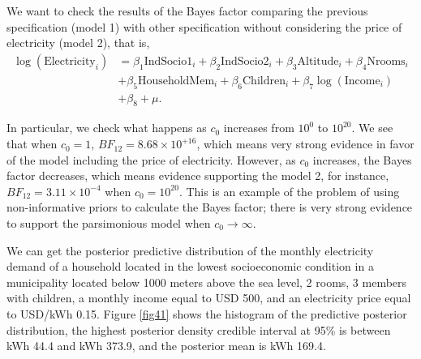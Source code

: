 We want to check the results of the Bayes factor comparing the previous specification (model 1) with other specification without considering the price of electricity (model 2), that is,
\begin{align*}
	\log(\text{Electricity}_i) & = \beta_1\text{IndSocio1}_i + \beta_2\text{IndSocio2}_i + \beta_3\text{Altitude}_i + \beta_4\text{Nrooms}_i\\
	& + \beta_5\text{HouseholdMem}_i + \beta_6\text{Children}_i + \beta_7\log(\text{Income}_i)\\
	& + \beta_8 + \mu.
\end{align*}

In particular, we check what happens as $c_0$ increases from $10^{0}$ to $10^{20}$. We see that when $c_0=1$, $BF_{12}=8.68\times 10^{+16}$, which means very strong evidence in favor of the model including the price of electricity. However, as $c_0$ increases, the Bayes factor decreases, which means evidence supporting the model 2, for instance, $BF_{12}=3.11\times 10^{-4}$ when $c_0=10^{20}$. This is an example of the problem of using non-informative priors to calculate the Bayes factor; there is very strong evidence to support the parsimonious model when $c_0\rightarrow \infty$.

We can get the posterior predictive distribution of the monthly electricity demand of a household located in the lowest socioeconomic condition in a municipality located below 1000 meters above the sea level, 2 rooms, 3 members with children, a monthly income equal to USD 500, and an electricity price equal to USD/kWh 0.15. Figure \ref{fig41} shows the histogram of the predictive posterior distribution, the highest posterior density credible interval at 95\% is between kWh 44.4 and kWh 373.9, and the posterior mean is kWh 169.4.      

